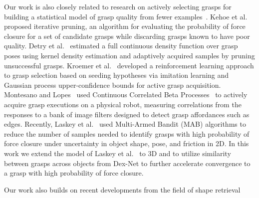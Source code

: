Our work is also closely related to research on actively selecting grasps for building a statistical model of grasp quality from fewer examples~\cite{boularias2015learning, salganicoff1996active}.
Kehoe et al.~\cite{kehoe2012estimating} proposed iterative pruning, an algorithm for evaluating the probability of force closure for a set of candidate grasps while discarding grasps known to have poor quality.
Detry et al.~\cite{detry2011learning} estimated a full continuous density function over grasp poses using kernel density estimation and adaptively acquired samples by pruning unsuccessful grasps.
Kroemer et al.~\cite{kroemer2010combining} developed a reinforcement learning approach to grasp selection based on seeding hypotheses via imitation learning and Gaussian process upper-confidence bounds for active grasp acquisition.
Montesano and Lopes~\cite{montesano2012active} used Continuous Correlated Beta Processes~\cite{goetschalckx2011continuous} to actively acquire grasp executions on a physical robot, measuring correlations from the responses to a bank of image filters designed to detect grasp affordances such as edges.
Recently, Laskey et al.~\cite{laskey2015bandits} used Multi-Armed Bandit (MAB) algorithms to reduce the number of samples needed to identify grasps with high probability of force closure under uncertainty in object shape, pose, and friction in 2D.
In this work we extend the model of Laskey et al.~\cite{laskey2015bandits} to 3D and to utilize similarity between grasps across objects from Dex-Net to further accelerate convergence to a grasp with high probability of force closure.

Our work also builds on recent developments from the field of shape retrieval










